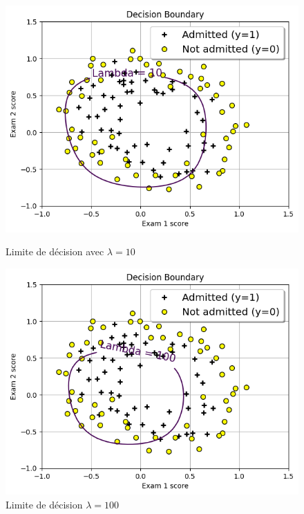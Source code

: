 \begin{figure}[!h]
    \begin{minipage}{.48\linewidth}
        \begin{center}
            \includegraphics[width=1\textwidth]{./img/4.5(3).png}
            \caption{\label{fig:4.5(3)}Limite de décision avec $\lambda=10$}  
        \end{center}
    \end{minipage}\hfill
    \begin{minipage}{.48\linewidth}
        \begin{center}
            \includegraphics[width=1\textwidth]{./img/4.5(4).png}
            \caption{\label{fig:4.5(4)}Limite de décision $\lambda=100$}  
        \end{center}
    \end{minipage}
\end{figure}

